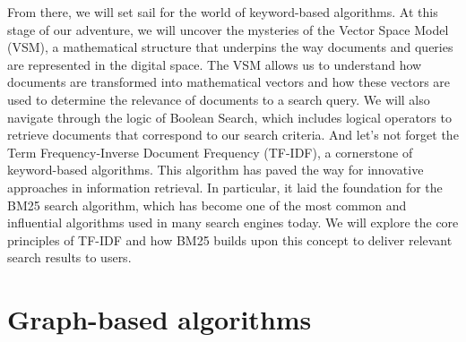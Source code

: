 \documentclass[10pt,english,a4paper]{article}
\begin{document}
From there, we will set sail for the world of keyword-based algorithms. At this stage of our adventure, we will uncover the mysteries of the Vector Space Model (VSM), a mathematical structure that underpins the way documents and queries are represented in the digital space. The VSM allows us to understand how documents are transformed into mathematical vectors and how these vectors are used to determine the relevance of documents to a search query. We will also navigate through the logic of Boolean Search, which includes logical operators to retrieve documents that correspond to our search criteria. And let's not forget the Term Frequency-Inverse Document Frequency (TF-IDF), a cornerstone of keyword-based algorithms. This algorithm has paved the way for innovative approaches in information retrieval. In particular, it laid the foundation for the BM25 search algorithm, which has become one of the most common and influential algorithms used in many search engines today. We will explore the core principles of TF-IDF and how BM25 builds upon this concept to deliver relevant search results to users.
\section{Graph-based algorithms}\label{graph-based}
\end{document}
